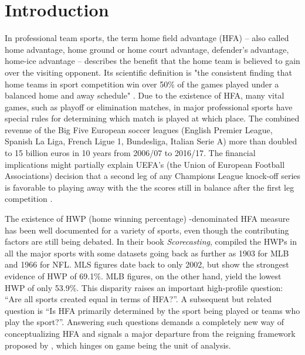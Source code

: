 \documentclass[]{interact}
\theoremstyle{plain}%
\theoremstyle{definition}
\theoremstyle{remark}
\begin{document}
\section{Introduction}

In professional team sports, the term home field advantage (HFA) – also called home advantage, home ground or home court advantage, defender's advantage, home-ice advantage – describes the benefit that the home team is believed to gain over the visiting opponent. Its scientific definition is "the consistent finding that home teams in sport competition win over 50\% of the games played under a balanced home and away schedule" \cite[p. 13]{Courneya1992}.
Due to the existence of HFA, many vital games, such as playoff or elimination matches, in major professional sports have special rules for determining which match is played at which place. The combined revenue of the Big Five European soccer leagues (English Premier League, Spanish La Liga, French Ligue 1, Bundesliga, Italian Serie A) more than doubled to 15 billion euros in 10 years from 2006/07 to 2016/17. The financial implications might partially explain UEFA's (the Union of European Football Associations) decision that a second leg of any Champions League knock-off series is favorable to playing away with the the scores still in balance after the first leg competition \citep{atkins2013}.





The existence of HWP (home winning percentage) -denominated HFA measure has been well documented for a variety of sports, even though the contributing factors are still being debated. In their book \textit{Scorecasting}, \cite{moskowitz2012scorecasting} compiled the HWPs in all the major sports with some datasets going back as further as 1903 for MLB and 1966 for NFL. MLS figures date back to only 2002, but show the strongest evidence of HWP of 69.1\%. MLB figures, on the other hand, yield the lowest HWP of only 53.9\%. This disparity raises an important high-profile question: ``Are all sports created equal in terms of HFA?''. A subsequent but related question is ``Is HFA primarily determined by the sport being played or teams who play the sport?''. Answering such questions demands a completely new way of conceptualizing HFA and signals a major departure from the reigning framework proposed by \cite{Courneya1992}, which hinges on game being the unit of analysis.  
\end{document}
